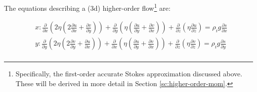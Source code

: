 The equations describing a (3d) higher-order flow\footnote{Specifically, the first-order accurate Stokes approximation discussed above. These will be derived in more detail in Section \ref{sc:higher-order-mom}.} are:

\begin{equation}
  \begin{split}
  & x: \frac{\partial}{\partial x}\left ( 2 \eta  
\left(2\frac{\partial u}{\partial x}+\frac{\partial v}{\partial y}\right)\right)
+\frac{\partial}{\partial y}\left(\eta \left(
\frac{\partial u}{\partial y}+\frac{\partial v}{\partial x}\right)\right)
+\frac{\partial}{\partial z}\left(\eta \frac{\partial u}{\partial z}\right)
=\rho_i g \frac{\partial s}{\partial x} \\
  & y: \frac{\partial}{\partial y}\left ( 2 \eta 
\left(2\frac{\partial v}{\partial y}+\frac{\partial u}{\partial x}\right)\right)
+\frac{\partial}{\partial x}\left(\eta \left(
\frac{\partial u}{\partial y}+\frac{\partial v}{\partial x}\right)\right)
+\frac{\partial}{\partial z}\left(\eta \frac{\partial v}{\partial z}\right)
=\rho_i g \frac{\partial s}{\partial y} \\
  \end{split}
\end{equation}

